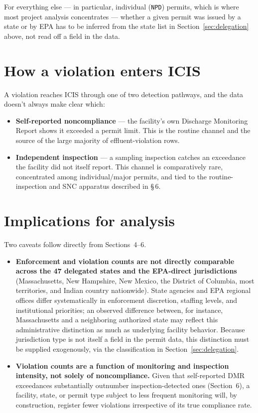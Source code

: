 \documentclass[11pt]{article}
\begin{document}
For everything else --- in particular, individual (\texttt{NPD}) permits, which is
where most project analysis concentrates --- whether a given permit was issued by a
state or by EPA has to be inferred from the state list in Section~\ref{sec:delegation}
above, not read off a field in the data.

\section{How a violation enters ICIS}

A violation reaches ICIS through one of two detection pathways, and the data doesn't
always make clear which:

\begin{itemize}
  \item \textbf{Self-reported noncompliance} --- the facility's own Discharge
        Monitoring Report shows it exceeded a permit limit. This is the routine channel
        and the source of the large majority of effluent-violation rows.
  \item \textbf{Independent inspection} --- a sampling inspection catches an exceedance
        the facility did not itself report. This channel is comparatively rare,
        concentrated among individual/major permits, and tied to the routine-inspection
        and SNC apparatus described in  \S\,6.
\end{itemize}

\section{Implications for analysis}

Two caveats follow directly from Sections~4--6.

\begin{itemize}
  \item \textbf{Enforcement and violation counts are not directly comparable across
        the 47 delegated states and the EPA-direct jurisdictions} (Massachusetts, New
        Hampshire, New Mexico, the District of Columbia, most territories, and Indian
        country nationwide). State agencies and EPA regional offices differ
        systematically in enforcement discretion, staffing levels, and institutional
        priorities; an observed difference between, for instance, Massachusetts and a
        neighboring authorized state may reflect this administrative distinction as
        much as underlying facility behavior. Because jurisdiction type is not itself a
        field in the permit data, this distinction must be supplied exogenously, via
        the classification in Section~\ref{sec:delegation}.
  \item \textbf{Violation counts are a function of monitoring and inspection
        intensity, not solely of noncompliance.} Given that self-reported DMR
        exceedances substantially outnumber inspection-detected ones (Section~6), a
        facility, state, or permit type subject to less frequent monitoring will, by
        construction, register fewer violations irrespective of its true compliance
        rate.
\end{itemize}
\end{document}

